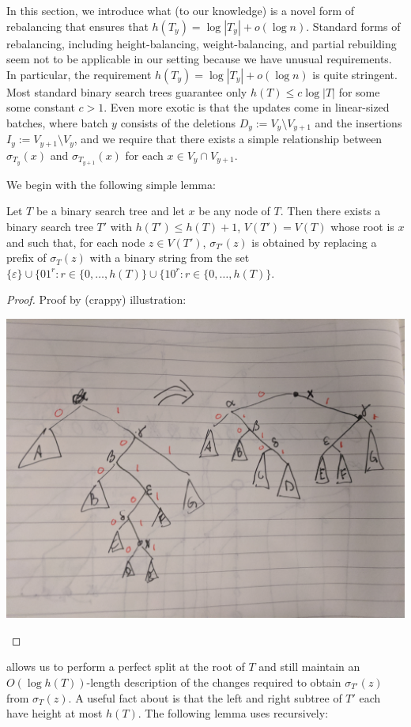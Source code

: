 \documentclass[kpfonts]{patmorin}
\begin{document}
In this section, we introduce what (to our knowledge) is a novel form of rebalancing that ensures that $h(T_y)=\log|T_y|+o(\log n)$.  Standard forms of rebalancing, including height-balancing, weight-balancing, and partial rebuilding seem not to be applicable in our setting because we have unusual requirements.  In particular, the requirement $h(T_y)=\log|T_y|+o(\log n)$ is quite stringent. Most standard binary search trees guarantee only $h(T)\le c\log |T|$ for some some constant $c>1$.  Even more exotic is that the updates come in linear-sized batches, where batch $y$ consists of the deletions $D_y:=V_y\setminus V_{y+1}$ and the insertions $I_y:=V_{y+1}\setminus V_y$, and we require that there exists a simple relationship between $\sigma_{T_y}(x)$ and $\sigma_{T_{y+1}}(x)$ for each $x\in V_y\cap V_{y+1}$.     

We begin with the following simple lemma:

\begin{lem}
  Let $T$ be a binary search tree and let $x$ be any node of $T$.  Then there exists a binary search tree $T'$ with $h(T')\le h(T)+1$, $V(T')=V(T)$ whose root is $x$ and such that, for each node $z\in V(T')$, $\sigma_{T'}(z)$ is obtained by replacing a prefix of $\sigma_{T}(z)$ with a binary string from the set $\{\varepsilon\}\cup \{01^r:r\in\{0,\ldots,h(T)\}\cup \{10^r:r\in\{0,\ldots,h(T)\}$.  
\end{lem}

\begin{proof}
Proof by (crappy) illustration:
  \begin{center}
    \includegraphics[width=.6\textwidth]{images/split}
  \end{center}
\end{proof}

 allows us to perform a perfect split at the root of $T$ and still maintain an $O(\log h(T))$-length description of the changes required to obtain $\sigma_{T'}(z)$ from $\sigma_T(z)$.  A useful fact about  is that the left and right subtree of $T'$ each have height at most $h(T)$.
The following lemma uses  recursively:
\end{document}
